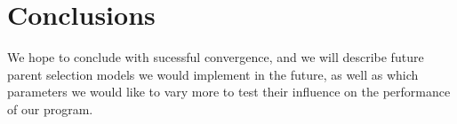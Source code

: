 
\section{Conclusions}
\label{sec:concl}

We hope to conclude with sucessful convergence, and we will describe future parent selection models we would implement in the future, as well as which parameters we would like to vary more to test their influence on the performance of our program. 